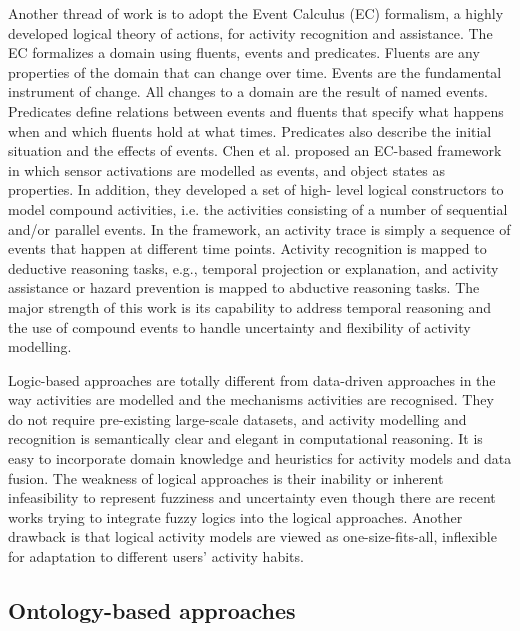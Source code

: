 Another thread of work is to adopt the Event Calculus (EC) \cite{Shanahan1997} formalism, a highly developed logical theory of actions, for activity recognition and assistance. The EC formalizes a domain using fluents, events and predicates. Fluents are any properties of the domain that can change over time. Events are the fundamental instrument of change. All changes to a domain are the result of named events. Predicates define relations between events and fluents that specify what happens when and which fluents hold at what times. Predicates also describe the initial situation and the effects of events. Chen et al. \cite{Chen2008} proposed an EC-based framework in which sensor activations are modelled as events, and object states as properties. In addition, they developed a set of high- level logical constructors to model compound activities, i.e. the activities consisting of a number of sequential and/or parallel events. In the framework, an activity trace is simply a sequence of events that happen at different time points. Activity recognition is mapped to deductive reasoning tasks, e.g., temporal projection or explanation, and activity assistance or hazard prevention is mapped to abductive reasoning tasks. The major strength of this work is its capability to address temporal reasoning and the use of compound events to handle uncertainty and flexibility of activity modelling. 

Logic-based approaches are totally different from data-driven approaches in the way activities are modelled and the mechanisms activities are recognised. They do not require pre-existing large-scale datasets, and activity modelling and recognition is semantically clear and elegant in computational reasoning. It is easy to incorporate domain knowledge and heuristics for activity models and data fusion. The weakness of logical approaches is their inability or inherent infeasibility to represent fuzziness and uncertainty even though there are recent works trying to integrate fuzzy logics into the logical approaches. Another drawback is that logical activity models are viewed as one-size-fits-all, inflexible for adaptation to different users’ activity habits.

\subsection{Ontology-based approaches}

